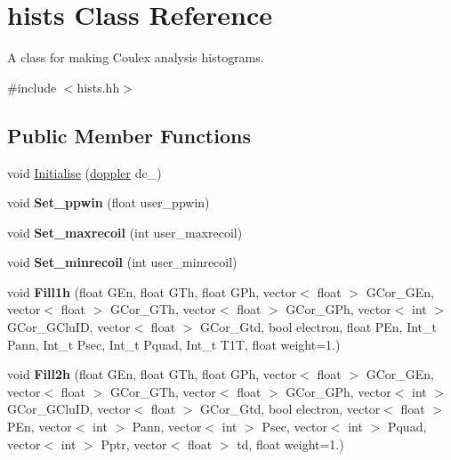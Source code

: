 \hypertarget{classhists}{}\section{hists Class Reference}
\label{classhists}


A class for making Coulex analysis histograms.  




{\ttfamily \#include $<$hists.\+hh$>$}

\subsection*{Public Member Functions}
\begin{DoxyCompactItemize}
\item 
void \hyperlink{classhists_affb3dcaefba3b63d20bbe438030e2f81}{Initialise} (\hyperlink{classdoppler}{doppler} dc\+\_\+)
\item 
\mbox{\label{classhists_a98cf7d91940c6d77105d07b0783399ee}} 
void {\bfseries Set\+\_\+ppwin} (float user\+\_\+ppwin)
\item 
\mbox{\label{classhists_ae986e831e139c9e7e5a4e327e864484d}} 
void {\bfseries Set\+\_\+maxrecoil} (int user\+\_\+maxrecoil)
\item 
\mbox{\label{classhists_acfb845682216224712565e7b8a1c3ce2}} 
void {\bfseries Set\+\_\+minrecoil} (int user\+\_\+minrecoil)
\item 
\mbox{\label{classhists_a0cc07e066791f9e8925fbbcfdc00d723}} 
void {\bfseries Fill1h} (float G\+En, float G\+Th, float G\+Ph, vector$<$ float $>$ G\+Cor\+\_\+\+G\+En, vector$<$ float $>$ G\+Cor\+\_\+\+G\+Th, vector$<$ float $>$ G\+Cor\+\_\+\+G\+Ph, vector$<$ int $>$ G\+Cor\+\_\+\+G\+Clu\+ID, vector$<$ float $>$ G\+Cor\+\_\+\+Gtd, bool electron, float P\+En, Int\+\_\+t Pann, Int\+\_\+t Psec, Int\+\_\+t Pquad, Int\+\_\+t T1T, float weight=1.)
\item 
\mbox{\label{classhists_a84e3dd3dc98652844bbfea63652eb280}} 
void {\bfseries Fill2h} (float G\+En, float G\+Th, float G\+Ph, vector$<$ float $>$ G\+Cor\+\_\+\+G\+En, vector$<$ float $>$ G\+Cor\+\_\+\+G\+Th, vector$<$ float $>$ G\+Cor\+\_\+\+G\+Ph, vector$<$ int $>$ G\+Cor\+\_\+\+G\+Clu\+ID, vector$<$ float $>$ G\+Cor\+\_\+\+Gtd, bool electron, vector$<$ float $>$ P\+En, vector$<$ int $>$ Pann, vector$<$ int $>$ Psec, vector$<$ int $>$ Pquad, vector$<$ int $>$ Pptr, vector$<$ float $>$ td, float weight=1.)

\end{DoxyCompactItemize}

